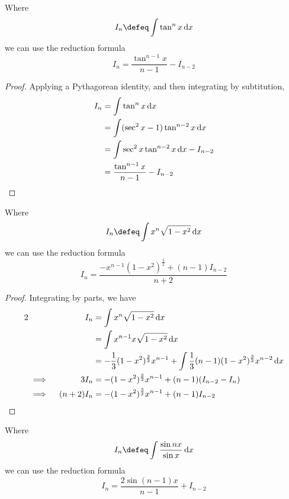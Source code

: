\begin{theorem}
 Where
 \begin{equation*}
  I_n \defeq \integ{\tan^n x}{x}
 \end{equation*}
 we can use the reduction formula
 \begin{equation*}
  I_n = \frac{\tan^{n - 1} x}{n - 1} - I_{n - 2}
 \end{equation*}
\end{theorem}
\begin{proof}
 Applying a Pythagorean identity, and then integrating by subtitution,
 \begin{align*}
  I_n &= \integ{\tan^n x}{x} \\
      &= \integ{(\sec^2 x - 1) \tan^{n - 2} x}{x} \\
      &= \integ{\sec^2 x \tan^{n - 2} x}{x} - I_{n - 2} \\
      &= \frac{\tan^{n - 1} x}{n - 1} - I_{n - 2} \qedhere
 \end{align*}
\end{proof}
\begin{theorem}
 Where
 \begin{equation*}
  I_n \defeq \integ{x^n \sqrt{1 - x^2}}{x}
 \end{equation*}
 we can use the reduction formula
 \begin{equation*}
  I_n = \frac{-x^{n - 1}(1 - x^2)^{\frac 32} + (n - 1) I_{n - 2}}{n + 2}
 \end{equation*}
\end{theorem}
\begin{proof}
 Integrating by parts, we have
 \begin{alignat*}2
  && I_n &= \integ{x^n \sqrt{1 - x^2}}{x} \\
  &&     &= \integ{x^{n - 1} x \sqrt{1 - x^2}}{x} \\
  &&     &= -\frac 13 (1 - x^2)^{\frac 32} x^{n - 1} +
            \integ{\frac 13 (n - 1)(1 - x^2)^{\frac 32}x^{n - 2}}{x} \\
  &\implies{}& 3 I_n
         &= -(1 - x^2)^{\frac 32} x^{n - 1} +
            (n - 1)(I_{n - 2} - I_n) \\
  &\implies{}& (n + 2)I_n
         &= -(1 - x^2)^{\frac 32} x^{n - 1} +
            (n - 1)I_{n - 2} \qedhere
 \end{alignat*}
\end{proof}
\begin{theorem}
 Where
 \begin{equation*}
  I_n \defeq \integ{\frac{\sin nx}{\sin x}}{x}
 \end{equation*}
 we can use the reduction formula
 \begin{equation*}
  I_n = \frac{2 \sin (n - 1) x}{n - 1} + I_{n - 2}
 \end{equation*}
\end{theorem}
